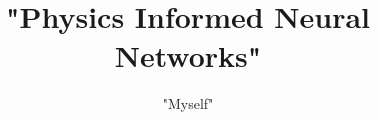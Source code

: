 \documentclass{article}
\begin{document}
\author{"Myself"}
\title{"Physics Informed Neural Networks"}
\maketitle 





{}

\end{document}
